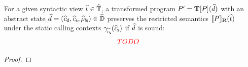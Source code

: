 \begin{theorem}
  \label{thm:preserve-prog}
  For a given syntactic view $\widehat{t} \in \widehat{\mathbb{T}}$, a transformed program
  $P' = \textbf{T}[P](\widehat{d})$ with an abstract state $\widehat{d} =
  (\widehat{c}_{\textsf{d}}, \widehat{c}_{\textsf{s}}, \widehat{\rho}_{\textsf{fs}}) \in \widehat{\mathbb{D}}$ preserves the restricted semantics
  $\llbracket{P}\rrbracket_\textbf{R}(\widehat{t})$ under the static calling contexts
  $\gamma_{\widehat{c}_{\textsf{s}}}(\widehat{c}_{\textsf{s}})$ if $\widehat{d}$ is sound:
  \[
    {\color{red}{TODO}}
  \]
\end{theorem}
\begin{proof}
  \todo
\end{proof}
